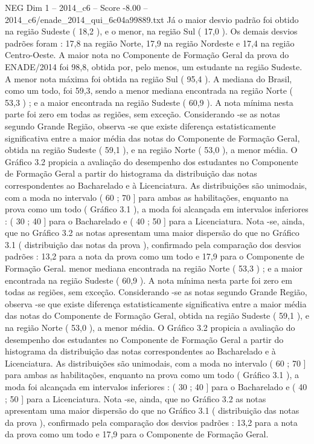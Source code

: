 \begin{textsample}{NEG Dim 1 – 2014\_c6 – Score -8.00 – 2014\_c6/enade\_2014\_qui\_6c04a99889.txt}
Já o maior desvio padrão foi obtido na região Sudeste ( 18,2 ), e o menor, na região Sul ( 17,0 ).
Os demais desvios padrões foram : 17,8 na região Norte, 17,9 na região Nordeste e 17,4 na região Centro-Oeste.
A maior nota no Componente de Formação Geral da prova do ENADE/2014 foi 98,8, obtida por, pelo menos, um estudante na região Sudeste.
A menor nota máxima foi obtida na região Sul ( 95,4 ).
A mediana do Brasil, como um todo, foi 59,3, sendo a menor mediana encontrada na região Norte ( 53,3 ) ; e a maior encontrada na região Sudeste ( 60,9 ).
A nota mínima nesta parte foi zero em todas as regiões, sem exceção.
Considerando -se as notas segundo Grande Região, observa -se que existe diferença estatisticamente significativa entre a maior média das notas do Componente de Formação Geral, obtida na região Sudeste ( 59,1 ), e na região Norte ( 53,0 ), a menor média.
O Gráfico 3.2 propicia a avaliação do desempenho dos estudantes no Componente de Formação Geral a partir do histograma da distribuição das notas correspondentes ao Bacharelado e à Licenciatura.
As distribuições são unimodais, com a moda no intervalo ( 60 ; 70 ] para ambas as habilitações, enquanto na prova como um todo ( Gráfico 3.1 ), a moda foi alcançada em intervalos inferiores : ( 30 ; 40 ] para o Bacharelado e ( 40 ; 50 ] para a Licenciatura.
Nota -se, ainda, que no Gráfico 3.2 as notas apresentam uma maior dispersão do que no Gráfico 3.1 ( distribuição das notas da prova ), confirmado pela comparação dos desvios padrões : 13,2 para a nota da prova como um todo e 17,9 para o Componente de Formação Geral. menor mediana encontrada na região Norte ( 53,3 ) ; e a maior encontrada na região Sudeste ( 60,9 ).
A nota mínima nesta parte foi zero em todas as regiões, sem exceção.
Considerando -se as notas segundo Grande Região, observa -se que existe diferença estatisticamente significativa entre a maior média das notas do Componente de Formação Geral, obtida na região Sudeste ( 59,1 ), e na região Norte ( 53,0 ), a menor média.
O Gráfico 3.2 propicia a avaliação do desempenho dos estudantes no Componente de Formação Geral a partir do histograma da distribuição das notas correspondentes ao Bacharelado e à Licenciatura.
As distribuições são unimodais, com a moda no intervalo ( 60 ; 70 ] para ambas as habilitações, enquanto na prova como um todo ( Gráfico 3.1 ), a moda foi alcançada em intervalos inferiores : ( 30 ; 40 ] para o Bacharelado e ( 40 ; 50 ] para a Licenciatura.
Nota -se, ainda, que no Gráfico 3.2 as notas apresentam uma maior dispersão do que no Gráfico 3.1 ( distribuição das notas da prova ), confirmado pela comparação dos desvios padrões : 13,2 para a nota da prova como um todo e 17,9 para o Componente de Formação Geral.

\end{textsample}
